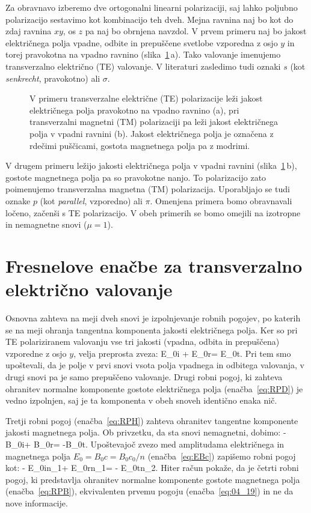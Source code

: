Za obravnavo izberemo dve ortogonalni linearni polarizaciji, saj lahko
poljubno polarizacijo sestavimo kot kombinacijo teh dveh.
Mejna ravnina naj bo kot do zdaj ravnina $xy$, os $z$ pa naj bo obrnjena navzdol. 
V prvem primeru naj bo jakost električnega polja
vpadne, odbite in prepuščene svetlobe vzporedna z osjo $y$ in torej pravokotna
na vpadno ravnino (slika~\ref{fig:04_tetm}\,a). 
Tako valovanje imenujemo transverzalno električno (TE) valovanje. 
V literaturi zasledimo tudi oznaki $s$ (kot {\it senkrecht}, pravokotno) ali $\sigma$.

\begin{figure}[ht]
\centering
\def\svgwidth{140truemm} 

\caption{V primeru transverzalne električne (TE) polarizacije leži jakost
električnega polja pravokotno na vpadno ravnino (a),
pri transverzalni magnetni (TM) polarizaciji pa leži jakost električnega
polja v vpadni ravnini (b). Jakost električnega polja je označena z rdečimi
puščicami, gostota magnetnega polja pa z modrimi.}
\label{fig:04_tetm}
\end{figure}

V drugem primeru ležijo jakosti električnega polja v 
vpadni ravnini (slika~\ref{fig:04_tetm}\,b), gostote magnetnega polja 
pa so pravokotne nanjo. To polarizacijo zato poimenujemo 
transverzalna magnetna (TM) polarizacija. Uporabljajo se tudi oznake
$p$ (kot {\it parallel}, vzporedno) ali $\pi$. 
Omenjena primera bomo obravnavali ločeno, začenši s TE polarizacijo. V 
obeh primerih se bomo omejili na izotropne in nemagnetne snovi ($\mu=1$).

\section{Fresnelove enačbe za transverzalno električno valovanje}
Osnovna zahteva na meji dveh snovi je izpolnjevanje robnih
pogojev, po katerih se na meji ohranja tangentna komponenta jakosti električnega
polja. Ker so pri TE polariziranem valovanju 
vse tri jakosti (vpadna, odbita in prepuščena) vzporedne z osjo $y$, velja preprosta zveza:
\beq
E_{0i} + E_{0r}= E_{0t}.
\label{eq:04_19}
\eeq
Pri tem smo upoštevali, da je polje v prvi snovi vsota polja vpadnega in odbitega
valovanja, v drugi snovi pa je samo prepuščeno valovanje. Drugi robni pogoj, ki zahteva
ohranitev normalne komponente gostote električnega polja (enačba~\ref{eq:RPD}) je 
vedno izpolnjen, saj je ta komponenta v obeh snoveh identično enaka nič. 

Tretji robni pogoj (enačba~\ref{eq:RPH}) zahteva
ohranitev tangentne komponente jakosti magnetnega polja. Ob privzetku, da
sta snovi nemagnetni, dobimo:
\beq
-B_{0i}\cos \alpha + B_{0r}\cos \alpha = -B_{0t}\cos \beta.
\label{eq:04_20}
\eeq
Upoštevajoč zvezo med amplitudama električnega in magnetnega 
polja $E_0 = B_0 c = B_0 c_0/n$  (enačba~\ref{eq:EBc}) zapišemo robni pogoj kot:
\beq
- E_{0i}n_1\cos \alpha + E_{0r}n_1\cos \alpha = - E_{0t}n_2\cos \beta.
\label{eq:04_21}
\eeq 
Hiter račun pokaže, da je četrti robni pogoj, ki predstavlja ohranitev 
normalne komponente gostote magnetnega polja (enačba~\ref{eq:RPB}), 
ekvivalenten prvemu pogoju (enačba~\ref{eq:04_19}) in ne da nove informacije. 

